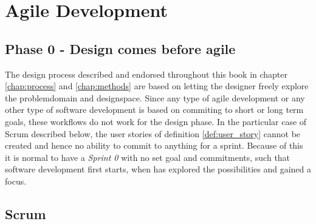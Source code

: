 \section{Agile Development} \label{sec:agile_development}

\begin{concept} \label{conc:agile} 
  
\end{concept}

\subsection{Phase 0 - Design comes before agile} \label{sec:design_before_agile}
The design process described and endorsed throughout this book in chapter \ref{chap:process} and \ref{chap:methods} are based on letting the designer freely explore the problemdomain and designspace. Since any type of agile development or any other type of software development is based on commiting to short or long term goals, these workflows do not work for the design phase. In the particular case of Scrum described below, the user stories of definition \ref{def:user_story} cannot be created and hence no ability to commit to anything for a sprint. Because of this it is normal to have a \emph{Sprint 0} with no set goal and commitments, such that software development first starts, when has explored the possibilities and gained a focus. \cite[p. 27]{beyer}

\subsection{Scrum} \label{sec:scrum} 

\begin{definition} \label{def:user_story} 
  
\end{definition}

\begin{definition} \label{def:product_owner} 

\end{definition}

\begin{definition} \label{def:scrum_master} 

\end{definition}

\begin{definition} \label{def:product_backlog} 

\end{definition}

